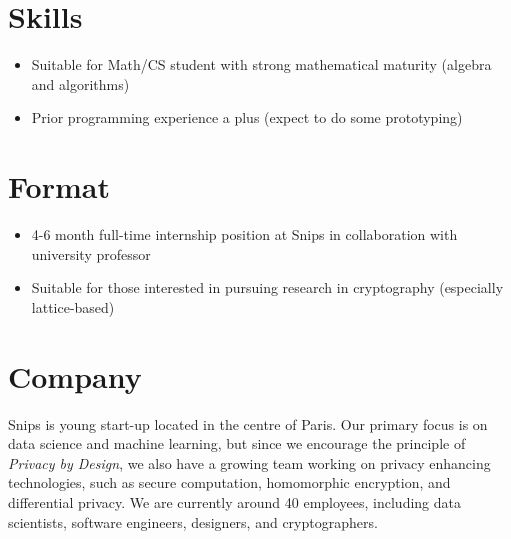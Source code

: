 \documentclass{article}
\begin{document}
\section*{Skills}
\begin{itemize}
\item Suitable for Math/CS student with strong mathematical maturity (algebra and algorithms)
\item Prior programming experience a plus (expect to do some prototyping)
\end{itemize}

\section*{Format}
\begin{itemize}
\item 4-6 month full-time internship position at Snips in collaboration with university professor
\item Suitable for those interested in pursuing research in cryptography (especially lattice-based)
\end{itemize}

\section*{Company}
Snips is young start-up located in the centre of Paris. Our primary focus is on data science and machine learning, but since we encourage the principle of \emph{Privacy by Design}, we also have a growing team working on privacy enhancing technologies, such as secure computation, homomorphic encryption, and differential privacy. We are currently around 40 employees, including data scientists, software engineers, designers, and cryptographers.
\end{document}
